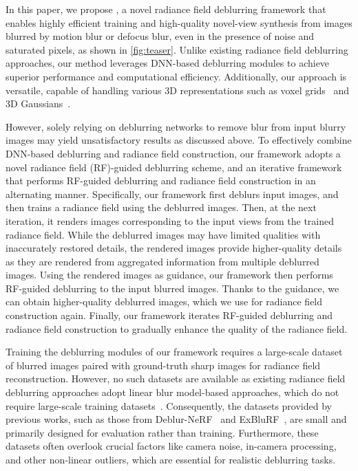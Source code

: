 In this paper, we propose \textit{\MethodName{}}, a novel radiance field deblurring framework that enables highly efficient training and high-quality novel-view synthesis from images blurred by motion blur or defocus blur, even in the presence of noise and saturated pixels, as shown in \cref{fig:teaser}. Unlike existing radiance field deblurring approaches, our method leverages DNN-based deblurring modules to achieve superior performance and computational efficiency. Additionally, our approach is versatile, capable of handling various 3D representations such as voxel grids~\cite{fridovich2022plenoxels} and 3D Gaussians~\cite{kerbl2023gaussiansplatting}.

However, solely relying on deblurring networks to remove blur from input blurry images may yield unsatisfactory results as discussed above.
To effectively combine DNN-based deblurring and radiance field construction, our framework adopts a novel radiance field (RF)-guided deblurring scheme, and an iterative framework that performs RF-guided deblurring and radiance field construction in an alternating manner.
Specifically, our framework first deblurs input images, and then trains a radiance field using the deblurred images.
Then, at the next iteration, it renders images corresponding to the input views from the trained radiance field.
While the deblurred images may have limited qualities with inaccurately restored details, the rendered images provide higher-quality details as they are rendered from aggregated information from multiple deblurred images.
Using the rendered images as guidance, our framework then performs RF-guided deblurring to the input blurred images.
Thanks to the guidance, we can obtain higher-quality deblurred images, which we use for radiance field construction again.
Finally, our framework iterates RF-guided deblurring and radiance field construction to gradually enhance the quality of the radiance field.

Training the deblurring modules of our framework requires a large-scale dataset of blurred images paired with ground-truth sharp images for radiance field reconstruction.
However, no such datasets are available as existing radiance field deblurring approaches adopt linear blur model-based approaches, which do not require large-scale training datasets~\cite{ma2022deblurnerf, wang2023badnerf, lee2023dpnerf, lee2023exblurf, peng2023pdrf, lee2024deblurring, peng2024bags}.
Consequently, the datasets provided by previous works, such as those from Deblur-NeRF~\cite{ma2022deblurnerf} and ExBluRF~\cite{lee2023exblurf}, are small and primarily designed for evaluation rather than training. Furthermore, these datasets often overlook crucial factors like camera noise, in-camera processing, and other non-linear outliers, which are essential for realistic deblurring tasks.

